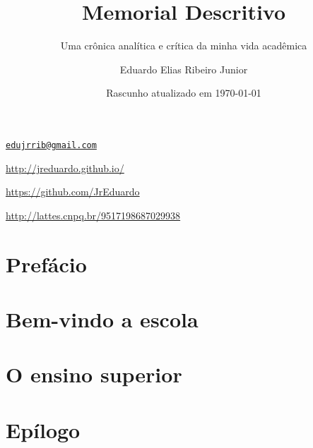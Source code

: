 \documentclass[10pt, a5paper]{memoir}
\date{}
\title{Memorial Descritivo}
\subtitle{Uma crônica analítica e crítica
  da minha vida acadêmica}
\author{Eduardo Elias Ribeiro Junior}
\date{Rascunho atualizado em \today}
\begin{document}
\begin{titlingpage}
\begin{minipage}[t]{8cm}
  \maketitle
  \begin{description}[leftmargin=!, labelwidth=1.3cm]
    \small
    \setlength\itemsep{-0.2em}
    \item[E-mail:]
      \href{mailto:edujrrib@gmail.com}{\nolinkurl{edujrrib@gmail.com}}
    \item[Website:]
      \url{http://jreduardo.github.io/}
    \item[GitHub:]
      \url{https://github.com/JrEduardo}
    \item[Lattes:]
      \url{http://lattes.cnpq.br/9517198687029938}
    \end{description}
\end{minipage}
\end{titlingpage}


\tableofcontents*
\clearpage


\chapter*{Prefácio}
\kant[1]

\chapter{Bem-vindo a escola}
\kant[1-5]

\chapter{O ensino superior}
\kant[1-10]

\chapter{Epílogo}
\kant[1-2]
\end{document}
